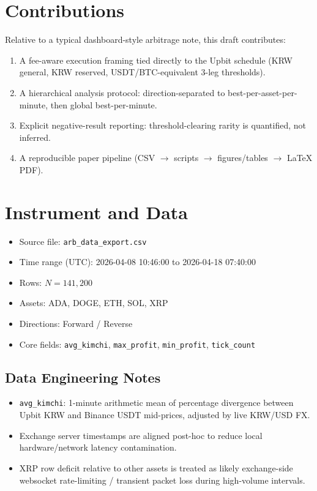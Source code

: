 \documentclass[11pt,a4paper]{article}
\begin{document}
\section{Contributions}
Relative to a typical dashboard-style arbitrage note, this draft contributes:
\begin{enumerate}
    \item A fee-aware execution framing tied directly to the Upbit schedule (KRW general, KRW reserved, USDT/BTC-equivalent 3-leg thresholds).
    \item A hierarchical analysis protocol: direction-separated to best-per-asset-per-minute, then global best-per-minute.
    \item Explicit negative-result reporting: threshold-clearing rarity is quantified, not inferred.
    \item A reproducible paper pipeline (CSV $\rightarrow$ scripts $\rightarrow$ figures/tables $\rightarrow$ LaTeX PDF).
\end{enumerate}

\section{Instrument and Data}
\begin{itemize}
    \item Source file: \texttt{arb\_data\_export.csv}
    \item Time range (UTC): 2026-04-08 10:46:00 to 2026-04-18 07:40:00
    \item Rows: $N = 141{,}200$
    \item Assets: ADA, DOGE, ETH, SOL, XRP
    \item Directions: Forward / Reverse
    \item Core fields: \texttt{avg\_kimchi}, \texttt{max\_profit}, \texttt{min\_profit}, \texttt{tick\_count}
\end{itemize}

\subsection*{Data Engineering Notes}
\begin{itemize}
    \item \texttt{avg\_kimchi}: 1-minute arithmetic mean of percentage divergence between Upbit KRW and Binance USDT mid-prices, adjusted by live KRW/USD FX.
    \item Exchange server timestamps are aligned post-hoc to reduce local hardware/network latency contamination.
    \item XRP row deficit relative to other assets is treated as likely exchange-side websocket rate-limiting / transient packet loss during high-volume intervals.
\end{itemize}
\end{document}
